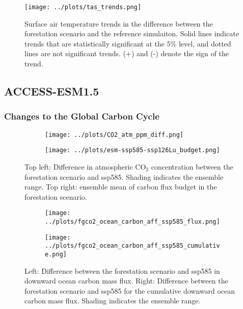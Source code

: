 \documentclass[]{article}
\begin{document}
\begin{figure}[H]
    \centering
    \texttt{[image: ../plots/tas\_trends.png]}
    \caption{Surface air temperature trends in the difference between the forestation scenario and the reference simulaiton. Solid lines indicate trends that are statistically significant at the 5\% level, and dotted lines are not significant trends. (+) and (-) denote the sign of the trend.}
    \label{fig:models_tas_trends}
\end{figure}

\subsection{ACCESS-ESM1.5}

\subsubsection{Changes to the Global Carbon Cycle}

\begin{figure}[H]
    \centering
    \begin{subfigure}[b]{0.4\linewidth}
        \texttt{[image: ../plots/CO2\_atm\_ppm\_diff.png]}
    \end{subfigure}
    \begin{subfigure}[b]{0.4\linewidth}
        \texttt{[image: ../plots/esm-ssp585-ssp126Lu\_budget.png]}
    \end{subfigure}
    \caption{Top left: Difference in atmospheric CO$_2$ concentration between the forestation scenario and ssp585. Shading indicates the ensemble range. Top right: ensemble mean of carbon flux budget in the forestation scenario.}
    \label{fig:atmosphere_carbon}
\end{figure}

\begin{figure}[H]
    \centering
    \begin{subfigure}[b]{0.4\linewidth}
        \texttt{[image: ../plots/fgco2\_ocean\_carbon\_aff\_ssp585\_flux.png]}
    \end{subfigure}
    \begin{subfigure}[b]{0.4\linewidth}
        \texttt{[image: ../plots/fgco2\_ocean\_carbon\_aff\_ssp585\_cumulative.png]}
    \end{subfigure}
    \caption{Left: Difference between the forestation scenario and ssp585 in downward ocean carbon mass flux. Right: Difference between the forestation scenario and ssp585 for the cumulative downward ocean carbon mass flux. Shading indicates the ensemble range.}
    \label{fig:ocean_carbon}
\end{figure}
\end{document}
